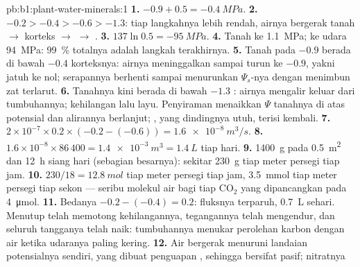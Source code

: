 \begin{solution}{pb:b1:plant-water-minerals:1}
\textbf{1.} $-0.9 + 0.5 = \qty{-0.4}{MPa}$.
\textbf{2.} $-0.2 > -0.4 > -0.6 > -1.3$: tiap langkahnya lebih rendah,
airnya bergerak tanah $\to$ korteks $\to$  $\to$ .
\textbf{3.} $137\ln 0.5 = \qty{-95}{MPa}$.
\textbf{4.} Tanah ke  \qty{1.1}{MPa};  ke udara \qty{94}{MPa}:
\qty{99}{\%} totalnya adalah langkah terakhirnya.
\textbf{5.} Tanah pada $-0.9$ berada di bawah $-0.4$  korteksnya:
airnya meninggalkan  sampai  turun ke $-0.9$, yakni
 jatuh ke nol; serapannya berhenti sampai  menurunkan
$\Psi_s$-nya dengan menimbun zat terlarut.
\textbf{6.} Tanahnya kini berada di bawah $-1.3$ : airnya
mengalir keluar dari tumbuhannya;  kehilangan  lalu layu.
Penyiraman menaikkan $\Psi$ tanahnya di atas potensial  dan
alirannya berlanjut; , yang dindingnya utuh, terisi kembali.
\textbf{7.} $2\times 10^{-7}\times 0.2\times(-0.2 - (-0.6)) =
\qty{1.6e-8}{m^3/s}$.
\textbf{8.} $1.6\times 10^{-8}\times 86\,400 = \qty{1.4e-3}{m^3} =
\qty{1.4}{L}$ tiap hari.
\textbf{9.} \qty{1400}{g} pada \qty{0.5}{m^2} dan \qty{12}{h} siang hari
(sebagian besarnya): sekitar \qty{230}{g} tiap meter persegi tiap jam.
\textbf{10.} $230/18 = \qty{12.8}{mol}$ tiap meter persegi tiap jam, \qty{3.5}{mmol} tiap meter persegi tiap sekon --- seribu molekul air bagi tiap $\mathrm{CO_2}$ yang dipancangkan pada \qty{4}{\micro mol}.
\textbf{11.} Bedanya $-0.2 - (-0.4) = 0.2$: fluksnya terparuh,
\qty{0.7}{L} sehari. Menutup  telah memotong kehilangannya,
tegangannya telah mengendur, dan seluruh tangganya telah naik:
tumbuhannya menukar perolehan karbon dengan air ketika udaranya paling
kering.
\textbf{12.} Air bergerak menuruni landaian potensialnya sendiri, yang
dibuat penguapan , sehingga  bersifat pasif; nitratnya

\end{solution}
